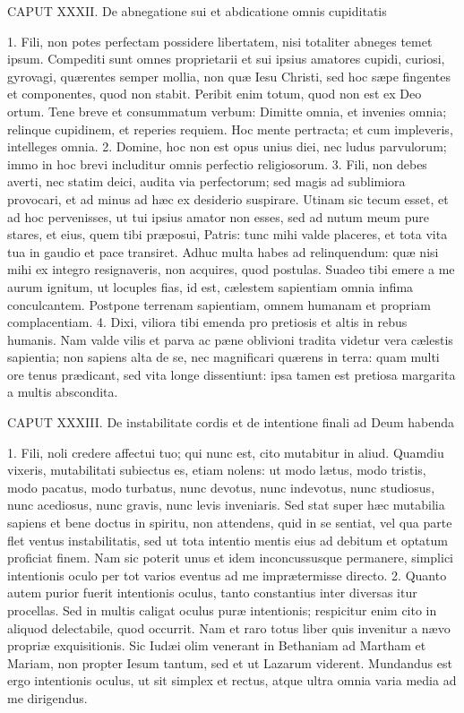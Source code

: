 CAPUT XXXII.
De abnegatione sui et abdicatione omnis cupiditatis

1. Fili, non potes perfectam possidere libertatem, nisi totaliter abneges temet ipsum. Compediti sunt omnes proprietarii et sui ipsius amatores cupidi, curiosi, gyrovagi, quærentes semper mollia, non quæ Iesu Christi, sed hoc sæpe fingentes et componentes, quod non stabit. Peribit enim totum, quod non est ex Deo ortum. Tene breve et consummatum verbum: Dimitte omnia, et invenies omnia; relinque cupidinem, et reperies requiem. Hoc mente pertracta; et cum impleveris, intelleges omnia.
2. Domine, hoc non est opus unius diei, nec ludus parvulorum; immo in hoc brevi includitur omnis perfectio religiosorum.
3. Fili, non debes averti, nec statim deici, audita via perfectorum; sed magis ad sublimiora provocari, et ad minus ad hæc ex desiderio suspirare. Utinam sic tecum esset, et ad hoc pervenisses, ut tui ipsius amator non esses, sed ad nutum meum pure stares, et eius, quem tibi præposui, Patris: tunc mihi valde placeres, et tota vita tua in gaudio et pace transiret. Adhuc multa habes ad relinquendum: quæ nisi mihi ex integro resignaveris, non acquires, quod postulas. Suadeo tibi emere a me aurum ignitum, ut locuples fias, id est, cælestem sapientiam omnia infima conculcantem. Postpone terrenam sapientiam, omnem humanam et propriam complacentiam.
4. Dixi, viliora tibi emenda pro pretiosis et altis in rebus humanis. Nam valde vilis et parva ac pæne oblivioni tradita videtur vera cælestis sapientia; non sapiens alta de se, nec magnificari quærens in terra: quam multi ore tenus prædicant, sed vita longe dissentiunt: ipsa tamen est pretiosa margarita a multis abscondita.


CAPUT XXXIII.
De instabilitate cordis et de intentione finali ad Deum habenda

1. Fili, noli credere affectui tuo; qui nunc est, cito mutabitur in aliud. Quamdiu vixeris, mutabilitati subiectus es, etiam nolens: ut modo lætus, modo tristis, modo pacatus, modo turbatus, nunc devotus, nunc indevotus, nunc studiosus, nunc acediosus, nunc gravis, nunc levis inveniaris. Sed stat super hæc mutabilia sapiens et bene doctus in spiritu, non attendens, quid in se sentiat, vel qua parte flet ventus instabilitatis, sed ut tota intentio mentis eius ad debitum et optatum proficiat finem. Nam sic poterit unus et idem inconcussusque permanere, simplici intentionis oculo per tot varios eventus ad me imprætermisse directo.
2. Quanto autem purior fuerit intentionis oculus, tanto constantius inter diversas itur procellas. Sed in multis caligat oculus puræ intentionis; respicitur enim cito in aliquod delectabile, quod occurrit. Nam et raro totus liber quis invenitur a nævo propriæ exquisitionis. Sic Iudæi olim venerant in Bethaniam ad Martham et Mariam, non propter Iesum tantum, sed et ut Lazarum viderent. Mundandus est ergo intentionis oculus, ut sit simplex et rectus, atque ultra omnia varia media ad me dirigendus.


